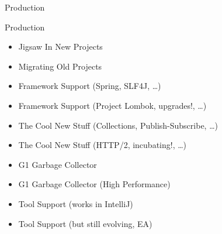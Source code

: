 \begin{frame}{Production}
\centering
\fontsize{20}{0}\selectfont
{}
\vspace{0.5cm}
\fontsize{20}{0}\selectfont
{}
\end{frame}

\begin{frame}{Production}
	\begin{itemize}
		\item[\textcolor{ForestGreen}{\cmark}] Jigsaw In New Projects
		\item[\textcolor{Orange}{\xmark}] Migrating Old Projects
		\item[\textcolor{ForestGreen}{\cmark}] Framework Support (Spring, SLF4J, \dots)
		\item[\textcolor{Orange}{\xmark}] Framework Support (Project Lombok, upgrades!, \dots)
		\item[\textcolor{ForestGreen}{\cmark}] The Cool New Stuff (Collections, Publish-Subscribe, \dots)
		\item[\textcolor{Orange}{\xmark}] The Cool New Stuff (HTTP/2, incubating!, \dots)
		\item[\textcolor{ForestGreen}{\cmark}] G1 Garbage Collector
		\item[\textcolor{Orange}{\xmark}] G1 Garbage Collector (High Performance)
		\item[\textcolor{ForestGreen}{\cmark}] Tool Support (works in IntelliJ)
		\item[\textcolor{Orange}{\xmark}] Tool Support (but still evolving, EA)
	\end{itemize}
\end{frame}